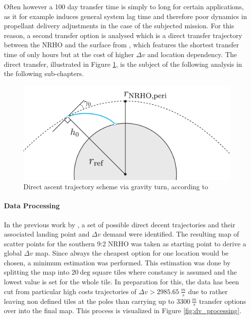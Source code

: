\documentclass[utf8]{FrontiersinHarvard} %
\begin{document}
Often however a 100 day transfer time is simply to long for certain applications, as it for example induces general system lag time and therefore poor dynamics in propellant delivery adjustments in the case of the subjected mission. For this reason, a second transfer option is analysed which is a direct transfer trajectory between the NRHO and the surface from \cite{Trofimov2020}, which features the shortest transfer time of only hours but at the cost of higher $\Delta v$ and location dependency. The direct transfer, illustrated in Figure \ref{fig:NRHO_trajectory}, is the subject of the following analysis in the following sub-chapters.

\begin{figure}[h!]
\begin{center}
\includegraphics[width=0.6\linewidth]{img/trajectory.pdf}
\end{center}
\caption{Direct ascent trajectory scheme via gravity turn, according to \cite{Trofimov2020}}
\label{fig:NRHO_trajectory}
\end{figure}

\paragraph{Data Processing}
In the previous work by \cite{Trofimov2020}, a set of possible direct decent trajectories and their associated landing point and $\Delta v$ demand were identified. The resulting map of scatter points for the southern 9:2 NRHO was taken as starting point to derive a global $\Delta v$ map.
Since always the cheapest option for one location would be chosen, a minimum estimation was performed.
This estimation was done by splitting the map into $20 \ \mathrm{deg}$ square tiles where constancy is assumed and the lowest value is set for the whole tile.
In preparation for this, the data has been cut from particular high costs trajectories of $\Delta v > 2985.65 \ \frac{m}{s}$ due to rather leaving non defined tiles at the poles than carrying up to $3300 \ \frac{m}{s}$ transfer options over into the final map.
This process is visualized in Figure \ref{fig:dv_processing}.
\end{document}

